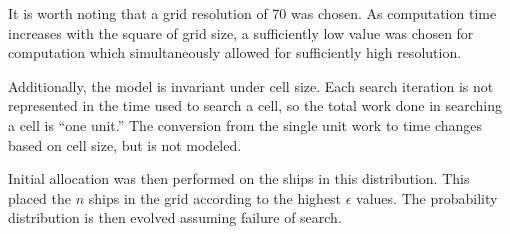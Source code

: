 \documentclass[a4paper]{article}
\begin{document}
It is worth noting that a grid resolution of 70 was chosen. As computation time increases with the square of grid size, a sufficiently low value was chosen for computation which simultaneously allowed for sufficiently high resolution. 

Additionally, the model is invariant under cell size. Each search iteration is not represented in the time used to search a cell, so the total work done in searching a cell is ``one unit.'' The conversion from the single unit work to time changes based on cell size, but is not modeled.

Initial allocation was then performed on the ships in this distribution. This placed the $n$ ships in the grid according to the highest $\epsilon$ values. The probability distribution is then evolved assuming failure of search. 
\end{document}
